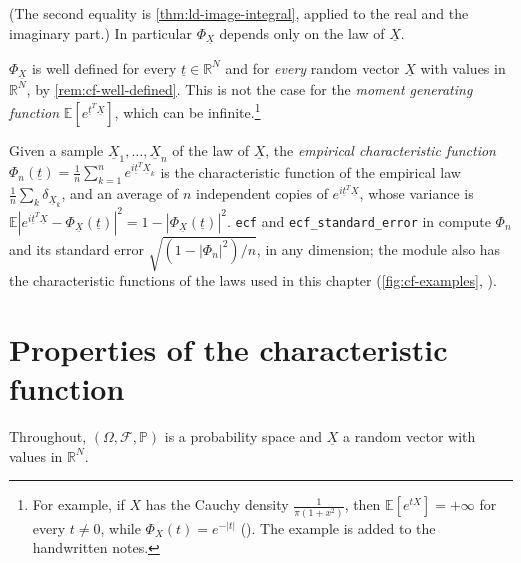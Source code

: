 (The second equality is \cref{thm:ld-image-integral}, applied to the real and the imaginary
part.) In particular $\Phi_{\underline X}$ depends only on the law of $\underline X$.

\begin{remark}\label{rem:cf-always-defined}
$\Phi_{\underline X}$ is well defined for every $\underline t\in\mathbb R^N$ and for
\emph{every} random vector $\underline X$ with values in $\mathbb R^N$, by
\cref{rem:cf-well-defined}. This is not the case for the \emph{moment generating function}
$\mathbb E[e^{\underline t^T\underline X}]$, which can be infinite.\footnote{For example, if $X$
has the Cauchy density $\frac1{\pi(1+x^2)}$, then $\mathbb E[e^{tX}]=+\infty$ for every
$t\ne0$, while $\Phi_X(t)=e^{-|t|}$ (). The example is added to the
handwritten notes.}
\end{remark}

\begin{remark}[computational]\label{rem:cf-code-ecf}
Given a sample $\underline X_1,\dots,\underline X_n$ of the law of $\underline X$, the
\emph{empirical characteristic function}
$\Phi_n(\underline t)=\frac1n\sum_{k=1}^ne^{i\underline t^T\underline X_k}$ is the characteristic
function of the empirical law $\frac1n\sum_k\delta_{\underline X_k}$, and an average of $n$
independent copies of $e^{i\underline t^T\underline X}$, whose variance is
$\mathbb E|e^{i\underline t^T\underline X}-\Phi_{\underline X}(\underline t)|^2=1-|\Phi_{\underline X}(\underline t)|^2$.
\texttt{ecf} and \texttt{ecf\_standard\_error} in  compute
$\Phi_n$ and its standard error $\sqrt{(1-|\Phi_n|^2)/n}$, in any dimension; the module also
has the characteristic functions of the laws used in this chapter (\cref{fig:cf-examples},
).
\end{remark}


\section{Properties of the characteristic function}\label{sec:cf-properties}

Throughout, $(\Omega,\mathcal F,\mathbb P)$ is a probability space and $\underline X$ a random
vector with values in $\mathbb R^N$.

